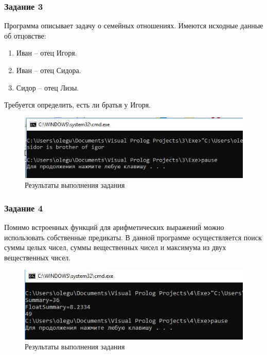 \documentclass[14pt,a4paper,report]{report}
\begin{document}
\subsubsection{Задание 3}

Программа описывает задачу о семейных отношениях. Имеются исходные данные об отцовстве: 

\begin{enumerate}
	\item Иван – отец Игоря.
	\item Иван – отец Сидора.
	\item Сидор – отец Лизы.
\end{enumerate}

Требуется определить, есть ли братья у Игоря. 




\begin{figure}[h!]
	\centering
	\includegraphics[scale = 0.9]{images/d3.png}
	\caption{Результаты выполнения задания}
\end{figure}
\clearpage
\subsubsection{Задание 4}

Помимо встроенных функций для арифметических выражений можно использовать собственные предикаты. В данной программе осуществляется поиск суммы целых чисел, суммы вещественных чисел и максимума из двух вещественных чисел.



\begin{figure}[h!]
	\centering
	\includegraphics[scale = 0.9]{images/d4.png}
	\caption{Результаты выполнения задания}
\end{figure}
\clearpage
\end{document}
